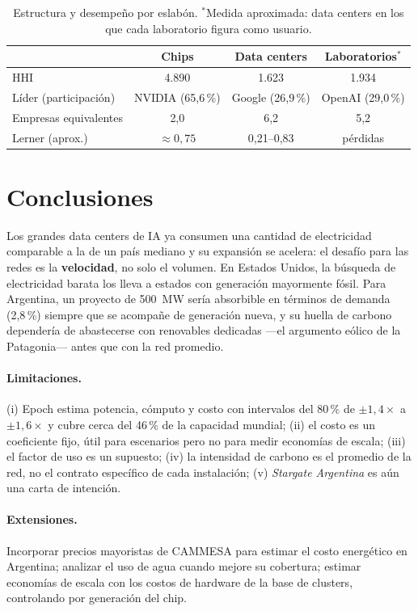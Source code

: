 \documentclass[11pt,a4paper]{article}
\begin{document}
\begin{table}[h]
\centering\small
\begin{tabular}{@{}lccc@{}}
\toprule
 & \textbf{Chips} & \textbf{Data centers} & \textbf{Laboratorios}$^{*}$ \\
\midrule
HHI & 4.890 & 1.623 & 1.934 \\
Líder (participación) & NVIDIA (65,6\,\%) & Google (26,9\,\%) & OpenAI (29,0\,\%) \\
Empresas equivalentes & 2,0 & 6,2 & 5,2 \\
Lerner (aprox.) & $\approx 0{,}75$ & 0,21--0,83 & pérdidas \\
\bottomrule
\end{tabular}
\caption{Estructura y desempeño por eslabón. $^{*}$Medida aproximada: data centers en los que cada laboratorio figura como usuario.}
\label{tab:oi}
\end{table}

\section{Conclusiones}

Los grandes data centers de IA ya consumen una cantidad de electricidad comparable a la de un país mediano y su expansión se acelera: el desafío para las redes es la \textbf{velocidad}, no solo el volumen. En Estados Unidos, la búsqueda de electricidad barata los lleva a estados con generación mayormente fósil. Para Argentina, un proyecto de 500~MW sería absorbible en términos de demanda (2,8\,\%) siempre que se acompañe de generación nueva, y su huella de carbono dependería de abastecerse con renovables dedicadas —el argumento eólico de la Patagonia— antes que con la red promedio.

\paragraph{Limitaciones.} (i) Epoch estima potencia, cómputo y costo con intervalos del 80\,\% de $\pm1{,}4\times$ a $\pm1{,}6\times$ y cubre cerca del 46\,\% de la capacidad mundial; (ii) el costo es un coeficiente fijo, útil para escenarios pero no para medir economías de escala; (iii) el factor de uso es un supuesto; (iv) la intensidad de carbono es el promedio de la red, no el contrato específico de cada instalación; (v) \emph{Stargate Argentina} es aún una carta de intención.

\paragraph{Extensiones.} Incorporar precios mayoristas de CAMMESA para estimar el costo energético en Argentina; analizar el uso de agua cuando mejore su cobertura; estimar economías de escala con los costos de hardware de la base de clusters, controlando por generación del chip.
\end{document}
